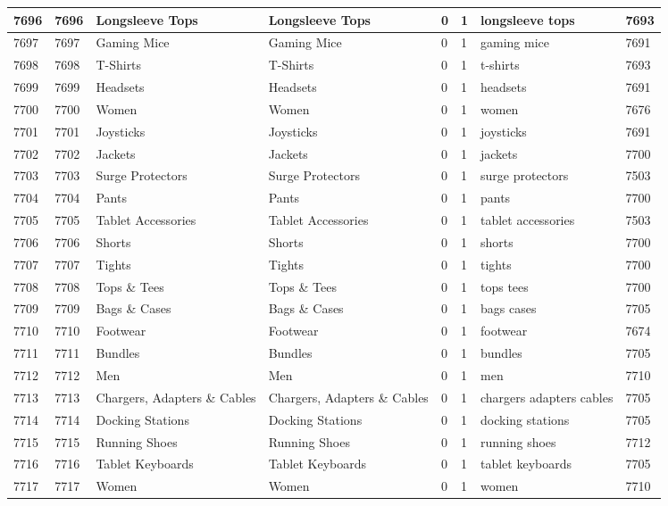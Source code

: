 \begin{longtable}{|l|l|l|l|l|l|l|l|}
7696 & 7696 & Longsleeve Tops & Longsleeve Tops & 0 & 1 & longsleeve tops & 7693 \\ \hline 
7697 & 7697 & Gaming Mice & Gaming Mice & 0 & 1 & gaming mice & 7691 \\ \hline 
7698 & 7698 & T-Shirts & T-Shirts & 0 & 1 & t-shirts & 7693 \\ \hline 
7699 & 7699 & Headsets & Headsets & 0 & 1 & headsets & 7691 \\ \hline 
7700 & 7700 & Women & Women & 0 & 1 & women & 7676 \\ \hline 
7701 & 7701 & Joysticks & Joysticks & 0 & 1 & joysticks & 7691 \\ \hline 
7702 & 7702 & Jackets & Jackets & 0 & 1 & jackets & 7700 \\ \hline 
7703 & 7703 & Surge Protectors & Surge Protectors & 0 & 1 & surge protectors & 7503 \\ \hline 
7704 & 7704 & Pants & Pants & 0 & 1 & pants & 7700 \\ \hline 
7705 & 7705 & Tablet Accessories & Tablet Accessories & 0 & 1 & tablet accessories & 7503 \\ \hline 
7706 & 7706 & Shorts & Shorts & 0 & 1 & shorts & 7700 \\ \hline 
7707 & 7707 & Tights & Tights & 0 & 1 & tights & 7700 \\ \hline 
7708 & 7708 & Tops \& Tees & Tops \& Tees & 0 & 1 & tops tees & 7700 \\ \hline 
7709 & 7709 & Bags \& Cases & Bags \& Cases & 0 & 1 & bags cases & 7705 \\ \hline 
7710 & 7710 & Footwear & Footwear & 0 & 1 & footwear & 7674 \\ \hline 
7711 & 7711 & Bundles & Bundles & 0 & 1 & bundles & 7705 \\ \hline 
7712 & 7712 & Men & Men & 0 & 1 & men & 7710 \\ \hline 
7713 & 7713 & Chargers, Adapters \& Cables & Chargers, Adapters \& Cables & 0 & 1 & chargers adapters cables & 7705 \\ \hline 
7714 & 7714 & Docking Stations & Docking Stations & 0 & 1 & docking stations & 7705 \\ \hline 
7715 & 7715 & Running Shoes & Running Shoes & 0 & 1 & running shoes & 7712 \\ \hline 
7716 & 7716 & Tablet Keyboards & Tablet Keyboards & 0 & 1 & tablet keyboards & 7705 \\ \hline 
7717 & 7717 & Women & Women & 0 & 1 & women & 7710 \\ \hline 

\end{longtable}
